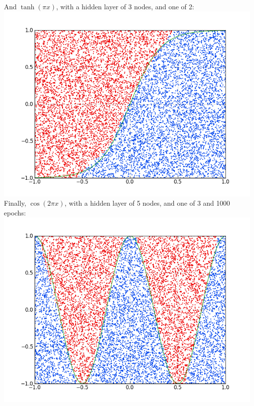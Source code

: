 \documentclass[12pt]{article}
\begin{document}
\begin{enumerate}
And $\tanh(\pi x)$, with a hidden layer of 3 nodes, and one of 2: \\ 
\includegraphics[scale=0.5]{test5.png}\\

Finally, $\cos(2 \pi x)$, with a hidden layer of 5 nodes, and one of 3 and 1000 epochs: \\ 
\includegraphics[scale=0.5]{test6.png}\\


\end{enumerate}
\end{document}
